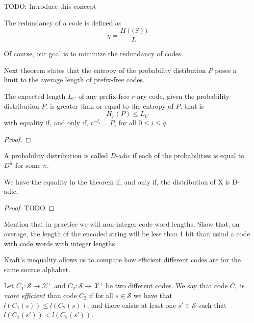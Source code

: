 {\color{red} TODO: Introduce this concept}

\begin{definition}
The redundancy of a code is defined as
\[
\eta = \frac{H(\mathcal(S))}{L}
\]
\end{definition}

Of course, our goal is to minimize the redundancy of codes.

Next theorem states that the entropy of the probability distibution $P$ poses a limit to the average length of prefix-free codes.

\begin{theorem}
\label{th:optimal_codes}
The expected length $L_{C}$ of any prefix-free $r$-ary code, given the probability distribution $P$, is greater than or equal to the entropy of $P$, that is
\[
H_{r}(P) \leq L_{C}
\]
with equality if, and only if, $r^{-l_{i}} = P_{i}$ for all $0 \leq i \leq q$.
\end{theorem}
\begin{proof}
\end{proof}

\begin{definition}
A probability distribution is called \emph{D-adic} if each of the probabilities is equal to $D^n$ for some $n$.
\end{definition}

\begin{corollary}
We have the equality in the theorem if, and only if, the distribution of X is D-adic.
\end{corollary}
\begin{proof}
{\color{red} TODO}
\end{proof}

{\color{red} Mention that in practice we will non-integer code word lengths. Show that, on average, the length of the encoded string will be less than 1 bit than usind a code with code words with integer lengths} 

Kraft's inequality allows us to compare how efficient different codes are for the same source alphabet.

\begin{definition}
Let $C_1:\mathcal{S}\rightarrow\mathcal{X}^{+}$ and $C_2:\mathcal{S}\rightarrow\mathcal{X}^{+}$ be two different codes. We say that code $C_1$ is \emph{more efficient} than code $C_2$ if for all $s \in \mathcal{S}$ we have that $l(C_1(s)) \leq l(C_2(s))$, and there exists at least one $s' \in \mathcal{S}$ such that $l(C_1(s')) < l(C_2(s'))$.
\end{definition}

